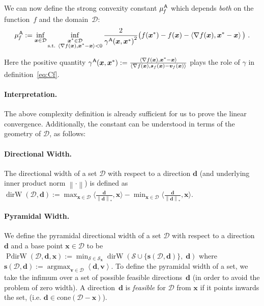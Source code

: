 \documentclass{article} %
\DeclareMathOperator*{\argmax}{\arg\max}
\providecommand{\norm}[1]{\left\lVert#1\right\rVert}
\providecommand{\dualnorm}[1]{\norm{#1}_*}
\newcommand{\domain}{\mathcal{D}}
\newcommand{\stepsize}{\gamma}
\newcommand{\away}{{\hspace{0.06em}\textsf{A}}}
\newcommand{\strongConvMFW}{\mu_{\hspace{-0.08em}f}^\away}
\newcommand{\dirW}{\mathop{dirW}}
\newcommand{\x}{\bm{x}}
\newcommand{\s}{\bm{s}}
\newcommand{\dd}{\bm{d}}
\newcommand{\vv}{\bm{v}} %
\renewcommand{\S}{\mathcal{S}}
\newcommand{\PdirW}{\mathop{PdirW}}
\newcommand{\innerProd}[2]{\left\langle #1 , #2 \right\rangle}
\newcommand{\0}{\mathbf{0}} %
\begin{document}
We can now define the strong convexity constant $\strongConvMFW$ which depends \emph{both} on the function~$f$ and the domain~$\domain$:\vspace{-3mm}
\begin{equation}\label{eq:muf}
  \strongConvMFW := \inf_{\x\in \domain} \inf_{\substack{\x^* \in \domain\\
                        \textrm{s.t. } \left\langle \nabla f(\x), \x^*-\x \right\rangle < 0 }}
           \frac{2}{{\stepsize^\away(\x,\x^*)}^2}
           \big( f(\x^*)-f(\x)-\left\langle \nabla f(\x),  \x^*-\x \right\rangle \big) \ .
\end{equation}\vspace{-4mm}

Here the positive quantity $\stepsize^\away(\x,\x^*) := \frac{\innerProd{\nabla f(\x)}{\x^*-\x} }{\innerProd{\nabla f(\x)}{\s_f(\x) - \vv_f(\x)} }$ plays the role of $\stepsize$ in definition~\eqref{eq:Cf}.
%

%

%
%
%
%
%

\vspace{-3mm}
\paragraph{Interpretation.}
The above complexity definition is already sufficient for us to prove the linear convergence. 
Additionally, the constant can be understood in terms of the geometry of $\domain$, as follows:

\vspace{-3mm}
\paragraph{Directional Width.}
The directional width of a set $\domain$ with respect to a direction $\dd$ (and underlying inner product norm $\norm{\cdot}$) is defined as $\dirW(\domain,\dd) := \max_{\x\in\domain} \big\langle \frac{\dd}{\dualnorm{\dd}}, \x \big\rangle-\min_{\x \in\domain} \big\langle \frac{\dd}{\dualnorm{\dd}}, \x \big\rangle$.\vspace{-2mm}

\vspace{-2mm}
\paragraph{Pyramidal Width.}
We define the pyramidal directional width of a set $\domain$ with respect to a direction $\dd$ and a base point $\x \in \domain$ to be
$
\PdirW(\domain,\dd, \x) := \min_{\S \in \S_{\x}} \dirW( \S \cup \{\s(\domain, \dd) \} , \; \dd)
$
where $\s(\domain,\dd) := \argmax_{\vv \in \domain}  \left\langle \dd, \vv \right\rangle$.
%
To define the pyramidal width of a set, we take the infimum over a set of possible feasible directions~$\dd$ (in order to avoid the problem of zero width).
%
A direction~$\dd$ is \emph{feasible} for $\domain$ from $\x$ if it points inwards the set, 
%
(i.e. $\dd \in \text{cone}(\domain-\x)$). 
\end{document}
